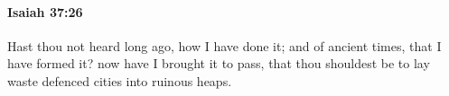 
		\paragraph{Isaiah 37:26} %
			\label{ISAIAH-37-26}

			Hast thou not heard long ago, how I have done it; and of ancient times, that I have formed it? now have I brought it to pass, that thou shouldest be to lay waste defenced cities into ruinous heaps.


